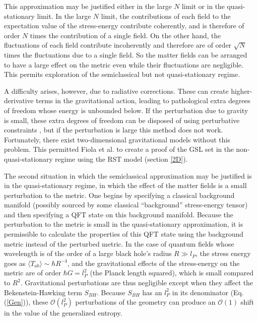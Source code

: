 \documentclass[12pt]{article}
\begin{document}
This approximation may be justified either in the large $N$ limit or in the quasi-stationary limit.  In the large $N$ limit, the contributions of each field to the expectation value of the stress-energy contribute coherently, and is therefore of order $N$ times the contribution of a single field.  On the other hand, the fluctuations of each field contribute incoherently and therefore are of order $\sqrt{N}$ times the fluctuations due to a single field.  So the matter fields can be arranged to have a large effect on the metric even while their fluctuations are negligible.  This permits exploration of the semiclassical but not quasi-stationary regime.

A difficulty arises, however, due to radiative corrections.  These can create higher-derivative terms in the gravitational action, leading to pathological extra degrees of freedom whose energy is unbounded below.  If the perturbation due to gravity is small, these extra degrees of freedom can be disposed of using perturbative constraints \cite{simon90}, but if the perturbation is large this method does not work.  Fortunately, there exist two-dimensional gravitational models without this problem.  This permitted Fiola et al. \cite{fiola94} to create a proof of the GSL set in the non-quasi-stationary regime using the RST model (section \ref{2D}).

The second situation in which the semiclassical approximation may be justified is in the quasi-stationary regime, in which the effect of the matter fields is a small perturbation to the metric.  One begins by specifying a classical background manifold (possibly sourced by some classical ``background'' stress-energy tensor) and then specifying a QFT state on this background manifold.  Because the perturbation to the metric is small in the quasi-stationary approximation, it is permissible to calculate the properties of this QFT state using the background metric instead of the perturbed metric.  In the case of quantum fields whose wavelength is of the order of a large black hole's radius $R \gg l_{P}$, the stress energy goes as $\langle T_{ab} \rangle \sim \hbar R^{-4}$, and the gravitational effects of the stress-energy on the metric are of order $\hbar G = l_{P}^2$ (the Planck length squared), which is small compared to $R^2$.  Gravitational perturbations are thus negligible except when they affect the Bekenstein-Hawking term $S_{BH}$.  Because $S_{BH}$ has an $l_{P}^2$ in its denominator (Eq. (\ref{Gen})), these $\mathcal{O}(l_{P}^2)$ perturbations of the geometry can produce an $\mathcal{O}(1)$ shift in the value of the generalized entropy.
\end{document}
